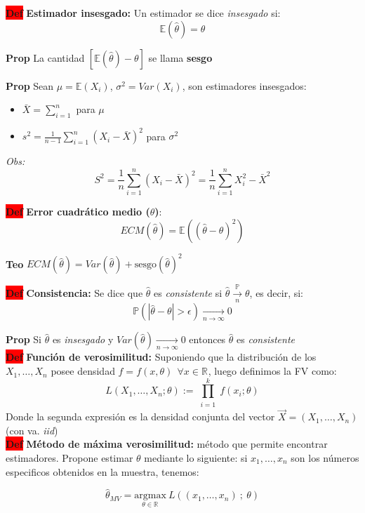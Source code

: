 \documentclass[letterpaper,10.5pt,twocolumn]{article} %
\newcommand{\R}[1][]{\mathbb{R}^{#1}}
\newcommand{\E}{\mathbb{E} }
\newcommand{\Proba}{\mathbb{P} }
\newcommand{\hlc}[2][yellow]{ \colorbox{#1}{#2} }
\newcommand{\Prop}{\hlc[amber]{\bfseries Prop}}
\newcommand{\Def}{\hlc[red]{\bfseries Def}}
\newcommand{\Teo}{\hlc[applegreen]{\bfseries Teo}}
\let\oldfrac=\frac
\renewcommand{\frac}[2]{\ensuremath{\oldfrac{#1}{#2}}}
\begin{document}
\Def \textbf{Estimador insesgado:} Un estimador se dice \textit{insesgado} si:
\begin{equation*}
     \E (\hat{\theta}) = \theta
 \end{equation*}

\Prop La cantidad $\left[\E (\hat{\theta}) - \theta \right]$ se llama \textbf{sesgo}

\Prop Sean $\mu = \E (X_i) $, $\sigma^2 = Var(X_i) $, son estimadores insesgados:
\begin{itemize}
    \item $\bar{X}=\sum\limits_{i=1}^{n} $ para $\mu $
    \item $s^2 = \frac{1}{n-1} \sum_{i=1}^{n} (X_i-\bar{X})^2 $ para $\sigma^2 $
\end{itemize}
\textit{Obs:} 
\begin{equation*}
    S^2 = \frac{1}{n} \sum_{i=1}^{n} (X_i - \bar{X})^2 = \frac{1}{n} \sum_{i=1}^{n} X_i^2 - \bar{X}^2
 \end{equation*}

\Def \textbf{Error cuadrático medio ($\hat{\theta}$)}: $$ECM(\hat{\theta}) = \E ((\hat{\theta} - \theta )^2 ) $$

\Teo $ECM(\hat{\theta}) = Var(\hat{\theta}) + \textrm{sesgo}(\hat{\theta})^2  $

\Def \textbf{Consistencia:} Se dice que $\hat{\theta} $ es \textit{consistente} si $ \hat{\theta} \xrightarrow[\ n\ ]{\Proba} \theta $, es decir, si:
 $$ \Proba (|\hat{\theta} - \theta |>\epsilon ) \xrightarrow[n \rightarrow \infty]{} 0 $$


\Prop Si $\hat{\theta} $ es \textit{insesgado} y $Var(\hat{\theta}) \xrightarrow[n\rightarrow \infty]{} 0 $ entonces $\hat{\theta} $ es \textit{consistente}\\

\Def \textbf{Función de verosimilitud:} Suponiendo que la distribución de los $X_1 , \ldots, X_n $ posee densidad $f = f(x,\theta)\ \ \forall x \in \R $, luego definimos la FV como:
$$ L (X_1,\ldots ,X_n;\theta) := \prod_{\substack{i=1}}^{k} f(x_i; \theta) $$
Donde la segunda expresión es la densidad conjunta del vector $\vec{X} = (X_1, \ldots, X_n)$ (con va. \textit{iid})\\

\Def \textbf{Método de máxima verosimilitud:} método que permite encontrar estimadores. Propone estimar $\theta $ mediante lo siguiente: si $x_1,\ldots,x_n $ son los números especificos obtenidos en la muestra, tenemos:

\begin{equation*}
    \hat{\theta}_{MV} = \underset{\theta \in \R}{\textrm{argmax}}\  L ((x_1, \ldots, x_n)\ ;\ \theta )
\end{equation*}
\end{document}
